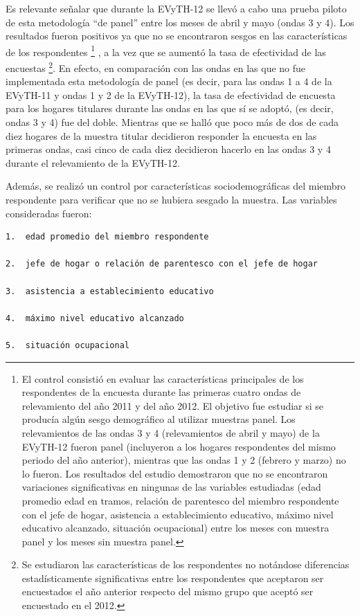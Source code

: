 \documentclass[
  openany]{book}
\begin{document}
Es relevante señalar que durante la EVyTH-12 se llevó a cabo una prueba piloto de esta metodología ``de panel'' entre los meses de abril y mayo (ondas 3 y 4). Los resultados fueron positivos ya que no se encontraron sesgos en las características de los respondentes \footnote{El control consistió en evaluar las características principales de los respondentes de la encuesta durante las primeras cuatro ondas de relevamiento del año 2011 y del año 2012. El objetivo fue estudiar si se producía algún sesgo demográfico al utilizar muestras panel. Los relevamientos de las ondas 3 y 4 (relevamientos de abril y mayo) de la EVyTH-12 fueron panel (incluyeron a los hogares respondentes del mismo periodo del año anterior), mientras que las ondas 1 y 2 (febrero y marzo) no lo fueron. Los resultados del estudio demostraron que no se encontraron variaciones significativas en ningunas de las variables estudiadas (edad promedio edad en tramos, relación de parentesco del miembro respondente con el jefe de hogar, asistencia a establecimiento educativo, máximo nivel educativo alcanzado, situación ocupacional) entre los meses con muestra panel y los meses sin muestra panel.} , a la vez que se aumentó la tasa de efectividad de las encuestas \footnote{Se estudiaron las características de los respondentes no notándose diferencias estadísticamente significativas entre los respondentes que aceptaron ser encuestados el año anterior respecto del mismo grupo que aceptó ser encuestado en el 2012.}. En efecto, en comparación con las ondas en las que no fue implementada esta metodología de panel (es decir, para las ondas 1 a 4 de la EVyTH-11 y ondas 1 y 2 de la EVyTH-12), la tasa de efectividad de encuesta para los hogares titulares durante las ondas en las que sí se adoptó, (es decir, ondas 3 y 4) fue del doble. Mientras que se halló que poco más de dos de cada diez hogares de la muestra titular decidieron responder la encuesta en las primeras ondas, casi cinco de cada diez decidieron hacerlo en las ondas 3 y 4 durante el relevamiento de la EVyTH-12.

Además, se realizó un control por características sociodemográficas del miembro respondente para verificar que no se hubiera sesgado la muestra. Las variables consideradas fueron:

\begin{verbatim}
1.  edad promedio del miembro respondente

2.  jefe de hogar o relación de parentesco con el jefe de hogar

3.  asistencia a establecimiento educativo

4.  máximo nivel educativo alcanzado

5.  situación ocupacional
\end{verbatim}
\end{document}
